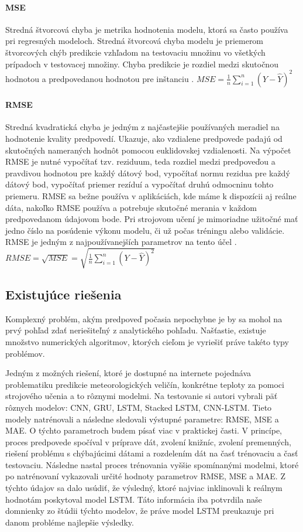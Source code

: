 \paragraph{MSE} Stredná štvorcová chyba je metrika hodnotenia modelu, ktorá sa často používa pri regresných modeloch. Stredná štvorcová chyba modelu je priemerom štvorcových chýb predikcie vzhľadom na testovaciu množinu vo všetkých prípadoch v testovacej množiny. Chyba predikcie je rozdiel medzi skutočnou hodnotou a predpovedanou hodnotou pre inštanciu \cite{mae}. \newline
$MSE = {\frac{1}{n}\sum_{i=1}^{n}(Y-\widehat{Y})^{2}}$

\paragraph{RMSE} Stredná kvadratická chyba je jedným z najčastejšie používaných meradiel na hodnotenie kvality predpovedí. Ukazuje, ako vzdialene predpovede padajú od skutočných nameraných hodnôt pomocou euklidovskej vzdialenosti. Na výpočet RMSE je nutné vypočítať tzv. reziduum, teda rozdiel medzi predpoveďou a pravdivou hodnotou pre každý dátový bod, vypočítať normu rezidua pre každý dátový bod, vypočítať priemer rezíduí a vypočítať druhú odmocninu tohto priemeru. RMSE sa bežne používa v aplikáciách, kde máme k dispozícii aj reálne dáta, nakoľko RMSE používa a potrebuje skutočné merania v každom predpovedanom údajovom bode. Pri strojovom učení je mimoriadne užitočné mať jedno číslo na posúdenie výkonu modelu, či už počas tréningu alebo validácie. RMSE je jedným z najpoužívanejších parametrov na tento účel \cite{rmse}. \newline
$RMSE = \sqrt{MSE} = \sqrt{\frac{1}{n}\sum_{i=1}^{n}(Y-\widehat{Y})^{2}}$

\newpage

\subsection{Existujúce riešenia}
Komplexný problém, akým predpoveď počasia nepochybne je by sa mohol na prvý pohľad zdať neriešiteľný z analytického pohľadu. Našťastie, existuje množstvo numerických algoritmov, ktorých cieľom je vyriešiť práve takéto typy problémov. 

Jedným z možných riešení, ktoré je dostupné na internete pojednáva problematiku predikcie meteorologických veličín, konkrétne teploty za pomoci strojového učenia a to rôznymi modelmi. Na testovanie si autori vybrali päť rôznych modelov: CNN, GRU, LSTM, Stacked LSTM, CNN-LSTM. Tieto modely natrénovali a následne sledovali výstupné parametre: RMSE, MSE a MAE. O týchto parametroch budem písať viac v praktickej časti. V princípe, proces predpovede spočíval v príprave dát, zvolení knižníc, zvolení premenných, riešení problému s chýbajúcimi dátami a rozdelením dát na časť trénovaciu a časť testovaciu. Následne nastal proces trénovania vyššie spomínanými modelmi, ktoré po natrénovaní vykazovali určité hodnoty parametrov RMSE, MSE a MAE. Z týchto údajov sa dalo usúdiť, že výsledný, ktoré najviac inklinovali k reálnym hodnotám poskytoval model LSTM. Táto informácia iba potvrdila naše domnienky zo štúdii týchto modelov, že práve model LSTM preukazuje pri danom probléme najlepšie výsledky. 

